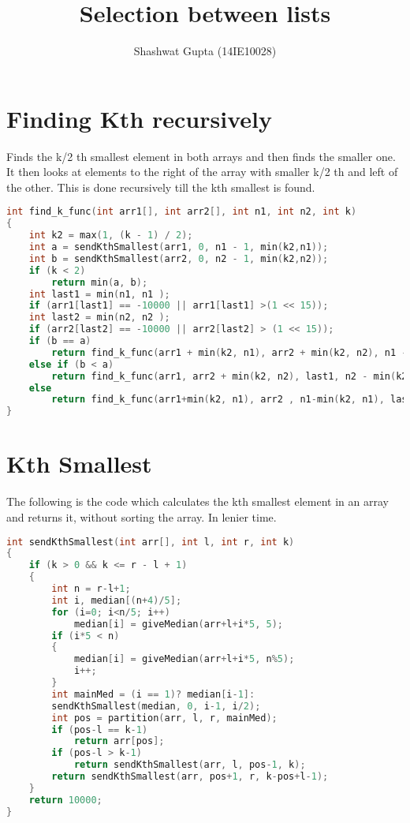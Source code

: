 \documentclass{article}
\title{Selection between lists}
\author{Shashwat Gupta (14IE10028)}
\begin{document}
\maketitle

\section{Finding Kth recursively}

Finds the k/2 th smallest element in both arrays and then finds the smaller one. It then looks at elements to the right of the array with smaller k/2 th and left of the other. This is done recursively till the kth smallest is found.
\begin{lstlisting}[language=c, caption=K recursive]
int find_k_func(int arr1[], int arr2[], int n1, int n2, int k)
{
    int k2 = max(1, (k - 1) / 2);
    int a = sendKthSmallest(arr1, 0, n1 - 1, min(k2,n1));
    int b = sendKthSmallest(arr2, 0, n2 - 1, min(k2,n2));
    if (k < 2)
        return min(a, b);
    int last1 = min(n1, n1 );
    if (arr1[last1] == -10000 || arr1[last1] >(1 << 15));
    int last2 = min(n2, n2 );
    if (arr2[last2] == -10000 || arr2[last2] > (1 << 15));
    if (b == a)
        return find_k_func(arr1 + min(k2, n1), arr2 + min(k2, n2), n1 - min(k2, n1), n2 - min(k2, n2), k - k2 * 2);
    else if (b < a)
        return find_k_func(arr1, arr2 + min(k2, n2), last1, n2 - min(k2, n2), k - k2);
    else
        return find_k_func(arr1+min(k2, n1), arr2 , n1-min(k2, n1), last2, k - k2);
}
\end{lstlisting}

\section{Kth Smallest}

The following is the code which calculates the kth smallest element in an array and returns it, without sorting the array. In lenier time.

\begin{lstlisting}[language=c, caption=Kth smallest]
int sendKthSmallest(int arr[], int l, int r, int k)
{
    if (k > 0 && k <= r - l + 1)
    {
        int n = r-l+1;
        int i, median[(n+4)/5];
        for (i=0; i<n/5; i++)
            median[i] = giveMedian(arr+l+i*5, 5);
        if (i*5 < n)
        {
            median[i] = giveMedian(arr+l+i*5, n%5);
            i++;
        }
        int mainMed = (i == 1)? median[i-1]:
        sendKthSmallest(median, 0, i-1, i/2);
        int pos = partition(arr, l, r, mainMed);
        if (pos-l == k-1)
            return arr[pos];
        if (pos-l > k-1)
            return sendKthSmallest(arr, l, pos-1, k);
        return sendKthSmallest(arr, pos+1, r, k-pos+l-1);
    }
    return 10000;
}
\end{lstlisting}
\end{document}
